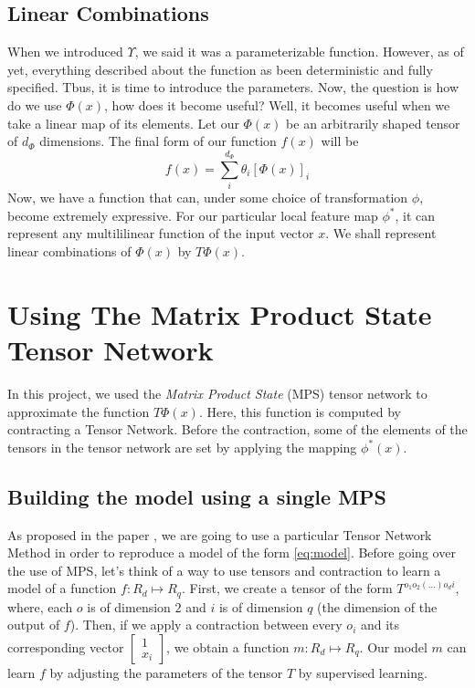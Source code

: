 \documentclass{article}
\theoremstyle{definition}
\theoremstyle{definition}
\begin{document}
\subsection{Linear Combinations}
When we introduced $\Upsilon$, we said it was a parameterizable function.
However, as of yet, everything described about the function as been deterministic and fully specified.
Tbus, it is time to introduce the parameters. 
Now, the question is how do we use $\Phi(x)$, how does it become useful? 
Well, it becomes useful when we take a linear map of its elements. Let our $\Phi(x)$ be an 
arbitrarily shaped tensor of $d_{\Phi}$ dimensions. The final form of our 
function $f(x)$ will be
\begin{equation} \label{eq:model}
    f(x) = \sum_{i}^{d_{\Phi}} \theta_i [\Phi(x)]_i
\end{equation}
Now, we have a function that can, under some choice of transformation
$\phi$, become extremely expressive. For our particular local feature map 
$\phi^*$, it can represent any multililinear function  of the input vector $x$. 
We shall represent linear combinations of $\Phi(x)$ by $T\Phi(x)$.

\section{Using The Matrix Product State Tensor Network}

In this project, we used the {\it Matrix Product State} (MPS) tensor network to 
approximate the function $T  \Phi(x)$. Here, this function is computed by contracting 
a Tensor Network. Before the contraction, some of the elements of the tensors in the 
tensor network are set by applying the mapping $\phi^*(x)$.

\subsection{Building the model using a single MPS}
As proposed in the paper \cite{stoudenmire2017supervised}, we are going to use 
a particular Tensor Network Method in order to reproduce a model of the form \ref{eq:model}.
Before going over the use of MPS, let's think of a way to use tensors and contraction to 
learn a model of a function $f: R_d \mapsto R_q$. First, we create a tensor of the form $T^{o_1 o_2 (\dots) o_d i}$, 
where, each $o$ is of dimension $2$ and $i$ is of dimension $q$ (the dimension of the output of $f$). Then, if we apply a contraction 
between every $o_i$ and its corresponding vector $\begin{bmatrix}1 \\x_i\end{bmatrix}$, we obtain
a function $m: R_d \mapsto R_q$. Our model $m$ can learn $f$ by adjusting the parameters of the tensor 
$T$ by supervised learning.
\end{document}

